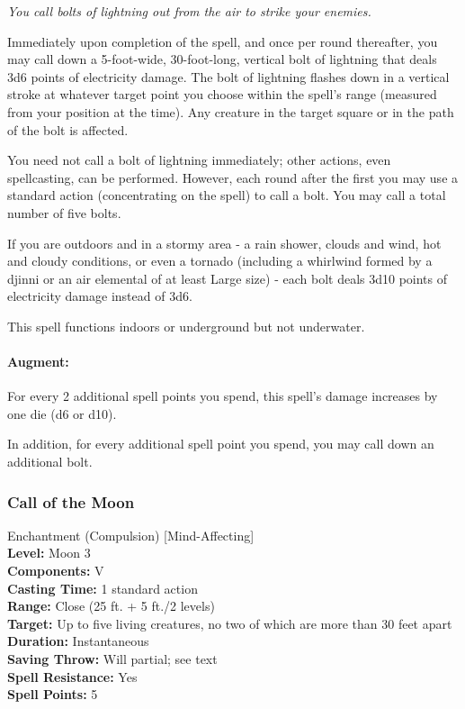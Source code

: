 \emph{You call bolts of lightning out from the air to strike your enemies.}

Immediately upon completion of the spell, and once per round thereafter, you may call down a 5-foot-wide, 30-foot-long, vertical bolt of lightning that deals 3d6 points of electricity damage. 
The bolt of lightning flashes down in a vertical stroke at whatever target point you choose within the spell's range (measured from your position at the time). 
Any creature in the target square or in the path of the bolt is affected.

You need not call a bolt of lightning immediately; other actions, even spellcasting, can be performed. 
However, each round after the first you may use a standard action (concentrating on the spell) to call a bolt. You may call a total number of five bolts.

If you are outdoors and in a stormy area - a rain shower, clouds and wind, hot and cloudy conditions, or even a tornado (including a whirlwind formed by a djinni or an air elemental of at least Large size) - each bolt deals 3d10 points of electricity damage instead of 3d6.

This spell functions indoors or underground but not underwater.

\paragraph{Augment:} For every 2 additional spell points you spend, this spell's damage increases by one die (d6 or d10).

In addition, for every additional spell point you spend, you may call down an additional bolt.
\subsubsection{Call of the Moon}
\label{Spell:CallOfTheMoon}
Enchantment (Compulsion) [Mind-Affecting]
\\ \textbf{Level:} Moon 3
\\ \textbf{Components:} V
\\ \textbf{Casting Time:} 1 standard action
\\ \textbf{Range:} Close (25 ft. + 5 ft./2 levels)
\\ \textbf{Target:} Up to five living creatures, no two of which are more than 30 feet apart
\\ \textbf{Duration:} Instantaneous
\\ \textbf{Saving Throw:} Will partial; see text
\\ \textbf{Spell Resistance:} Yes
\\ \textbf{Spell Points:} 5

